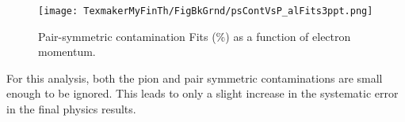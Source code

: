 \begin{figure}[H] %
\centering
\leavevmode \texttt{[image: TexmakerMyFinTh/FigBkGrnd/psContVsP\_alFits3ppt.png]}  %
\caption[Fits of pair-symmetric contamination]{Pair-symmetric contamination Fits (\%) as a function of electron momentum.  }
\label{figpcFits}
\end{figure}


For this analysis, both the pion and \epem pair symmetric contaminations are small enough to be ignored. This leads to only a slight increase in the systematic error in the final physics results. %
